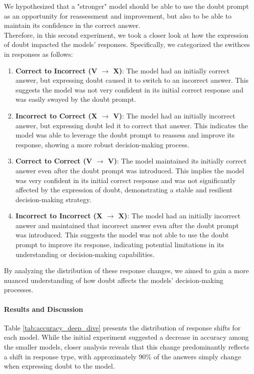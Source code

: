 We hypothesized that a "stronger" model should be able to use the doubt prompt as an opportunity for reassessment and improvement, but also to be able to maintain its confidence in the correct answer. \\
Therefore, in this second experiment, we took a closer look at how the expression of doubt impacted the models' responses. Specifically, we categorized the swithces in responses as follows:
\begin{enumerate}
  \item \textbf{Correct to Incorrect (V $\rightarrow$ X)}: The model had an initially correct answer, but expressing doubt caused it to switch to an incorrect answer. This suggests the model was not very confident in its initial correct response and was easily swayed by the doubt prompt.
  \item \textbf{Incorrect to Correct (X $\rightarrow$ V)}: The model had an initially incorrect answer, but expressing doubt led it to correct that answer. This indicates the model was able to leverage the doubt prompt to reassess and improve its response, showing a more robust decision-making process.
  \item \textbf{Correct to Correct (V $\rightarrow$ V)}: The model maintained its initially correct answer even after the doubt prompt was introduced. This implies the model was very confident in its initial correct response and was not significantly affected by the expression of doubt, demonstrating a stable and resilient decision-making strategy.
  \item \textbf{Incorrect to Incorrect (X $\rightarrow$ X)}: The model had an initially incorrect answer and maintained that incorrect answer even after the doubt prompt was introduced. This suggests the model was not able to use the doubt prompt to improve its response, indicating potential limitations in its understanding or decision-making capabilities.
\end{enumerate}

By analyzing the distribution of these response changes, we aimed to gain a more nuanced understanding of how doubt affects the models' decision-making processes.

\paragraph{Results and Discussion}

Table \ref{tab:accuracy_deep_dive} presents the distribution of response shifts for each model. While the initial experiment suggested a decrease in accuracy among the smaller models, closer analysis reveals that this change predominantly reflects a shift in response type, with approximately 90\% of the answers simply change when expressing doubt to the model.

